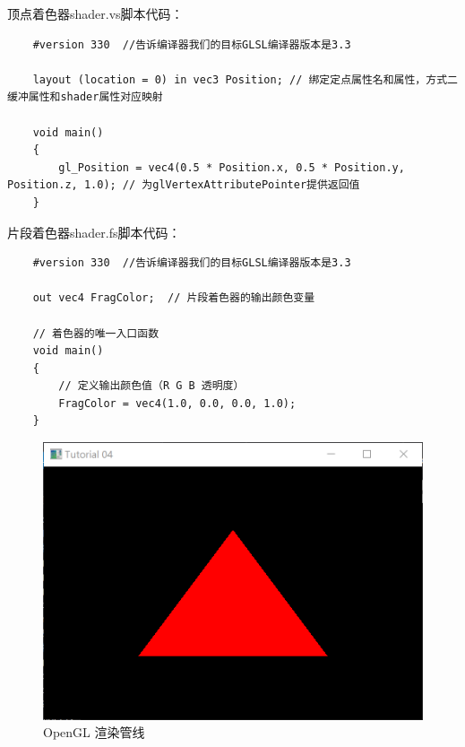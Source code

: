\documentclass[UTF8,a4paper,12pt]{ctexbook}
\begin{document}
		顶点着色器shader.vs脚本代码：
		\begin{lstlisting}
	#version 330  //告诉编译器我们的目标GLSL编译器版本是3.3
	
	layout (location = 0) in vec3 Position; // 绑定定点属性名和属性，方式二缓冲属性和shader属性对应映射
	
	void main()
	{
		gl_Position = vec4(0.5 * Position.x, 0.5 * Position.y, Position.z, 1.0); // 为glVertexAttributePointer提供返回值
	}		
		\end{lstlisting}
		
		片段着色器shader.fs脚本代码：
		\begin{lstlisting}
	#version 330  //告诉编译器我们的目标GLSL编译器版本是3.3
	
	out vec4 FragColor;  // 片段着色器的输出颜色变量
	
	// 着色器的唯一入口函数
	void main()
	{
		// 定义输出颜色值（R G B 透明度）
		FragColor = vec4(1.0, 0.0, 0.0, 1.0);
	}	
		\end{lstlisting}
		
		\begin{figure}[h]
			\centering
			\includegraphics[scale = 0.4]{result.png}
			\caption{OpenGL 渲染管线}
		\end{figure}
		
\end{document}
